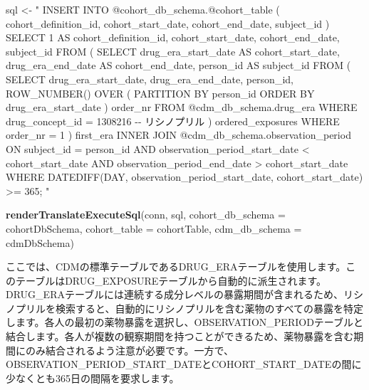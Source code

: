 \documentclass[
  11pt]{book}
\newenvironment{Shaded}{\begin{snugshade}}{\end{snugshade}}
\newcommand{\AttributeTok}[1]{\textcolor[rgb]{0.13,0.29,0.53}{#1}}
\newcommand{\FunctionTok}[1]{\textcolor[rgb]{0.13,0.29,0.53}{\textbf{#1}}}
\newcommand{\NormalTok}[1]{#1}
\newcommand{\OtherTok}[1]{\textcolor[rgb]{0.56,0.35,0.01}{#1}}
\newcommand{\StringTok}[1]{\textcolor[rgb]{0.31,0.60,0.02}{#1}}
\theoremstyle{definition}
\theoremstyle{definition}
\theoremstyle{definition}
\theoremstyle{definition}
\theoremstyle{remark}
\begin{document}
\begin{Shaded}
\begin{Highlighting}[]
\NormalTok{sql }\OtherTok{\textless{}{-}} \StringTok{"}
\StringTok{INSERT INTO @cohort\_db\_schema.@cohort\_table (}
\StringTok{  cohort\_definition\_id,}
\StringTok{  cohort\_start\_date,}
\StringTok{  cohort\_end\_date,}
\StringTok{  subject\_id}
\StringTok{)}
\StringTok{SELECT 1 AS cohort\_definition\_id,}
\StringTok{  cohort\_start\_date,}
\StringTok{  cohort\_end\_date,}
\StringTok{  subject\_id}
\StringTok{FROM (}
\StringTok{  SELECT drug\_era\_start\_date AS cohort\_start\_date,}
\StringTok{    drug\_era\_end\_date AS cohort\_end\_date,}
\StringTok{    person\_id AS subject\_id}
\StringTok{  FROM (}
\StringTok{    SELECT drug\_era\_start\_date,}
\StringTok{      drug\_era\_end\_date,}
\StringTok{      person\_id,}
\StringTok{      ROW\_NUMBER() OVER (}
\StringTok{        PARTITION BY person\_id}
\StringTok{            ORDER BY drug\_era\_start\_date}
\StringTok{      ) order\_nr}
\StringTok{    FROM @cdm\_db\_schema.drug\_era}
\StringTok{    WHERE drug\_concept\_id = 1308216 {-}{-} リシノプリル}
\StringTok{  ) ordered\_exposures}
\StringTok{  WHERE order\_nr = 1}
\StringTok{) first\_era}
\StringTok{INNER JOIN @cdm\_db\_schema.observation\_period}
\StringTok{  ON subject\_id = person\_id}
\StringTok{    AND observation\_period\_start\_date \textless{} cohort\_start\_date}
\StringTok{    AND observation\_period\_end\_date \textgreater{} cohort\_start\_date}
\StringTok{WHERE DATEDIFF(DAY,}
\StringTok{               observation\_period\_start\_date,}
\StringTok{               cohort\_start\_date) \textgreater{}= 365;}
\StringTok{"}

\FunctionTok{renderTranslateExecuteSql}\NormalTok{(conn, sql,}
                          \AttributeTok{cohort\_db\_schema =}\NormalTok{ cohortDbSchema,}
                          \AttributeTok{cohort\_table =}\NormalTok{ cohortTable,}
                          \AttributeTok{cdm\_db\_schema =}\NormalTok{ cdmDbSchema)}
\end{Highlighting}
\end{Shaded}

ここでは、CDMの標準テーブルであるDRUG\_ERAテーブルを使用します。このテーブルはDRUG\_EXPOSUREテーブルから自動的に派生されます。DRUG\_ERAテーブルには連続する成分レベルの暴露期間が含まれるため、リシノプリルを検索すると、自動的にリシノプリルを含む薬物のすべての暴露を特定します。各人の最初の薬物暴露を選択し、OBSERVATION\_PERIODテーブルと結合します。各人が複数の観察期間を持つことができるため、薬物暴露を含む期間にのみ結合されるよう注意が必要です。一方で、OBSERVATION\_PERIOD\_START\_DATEとCOHORT\_START\_DATEの間に少なくとも365日の間隔を要求します。
\end{document}
